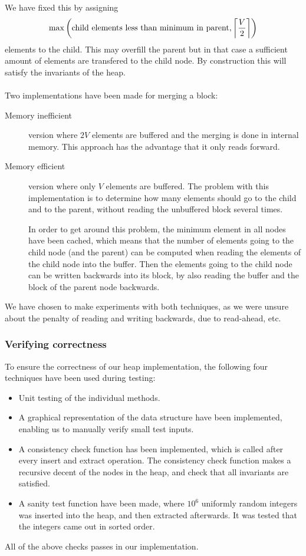 We have fixed this by assigning
\[
  \max \left( \text{child elements less than minimum in parent}, \ceil*{\frac{V}{2}} \right)
\]
elements to the child. This may overfill the parent but in that case a sufficient amount of elements
are transfered to the child node. By construction
this will satisfy the invariants of the heap.
\\
\\
Two implementations have been made for merging a block:
\begin{description}
\item[Memory inefficient] version where $2V$ elements are buffered
  and the merging is done in internal memory. This approach has the
  advantage that it only reads forward.
\item[Memory efficient] version where only $V$ elements are
  buffered. The problem with this implementation is to determine how
  many elements should go to the child and to the parent, without
  reading the unbuffered block several times.

  In order to get around this problem, the minimum element in all
  nodes have been cached, which means that the number of elements
  going to the child node (and the parent) can be computed when
  reading the elements of the child node into the buffer. Then the
  elements going to the child node can be written backwards into its
  block, by also reading the buffer and the block of the parent node
  backwards.
\end{description}

We have chosen to make experiments with both techniques, as we were unsure about
the penalty of reading and writing backwards, due to read-ahead,
etc.

\subsubsection{Verifying correctness}
To ensure the correctness of our heap implementation, the following
four techniques have been used during testing:
\begin{itemize}
\item Unit testing of the individual methods.
\item A graphical representation of the data structure have been
  implemented, enabling us to manually verify small test inputs.
\item A consistency check function has been implemented, which is
  called after every insert and extract operation. The consistency
  check function makes a recursive decent of the nodes in the heap,
  and check that all invariants are satisfied.
\item A sanity test function have been made, where $10^6$
  uniformly random integers was inserted into the heap, and then
  extracted afterwards. It was tested that the integers came out in
  sorted order.
\end{itemize}
All of the above checks passes in our implementation.

